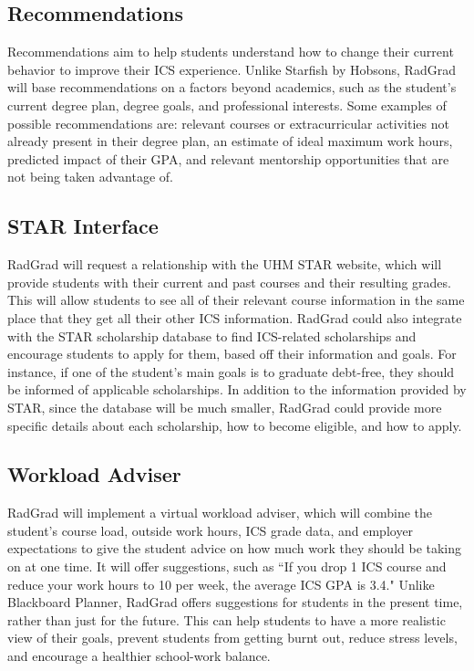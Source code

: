 \subsection{Recommendations}
Recommendations aim to help students understand how to change their current behavior to improve their ICS experience. Unlike Starfish by Hobsons, RadGrad will base recommendations on a factors beyond academics, such as the student's current degree plan, degree goals, and professional interests. Some examples of possible recommendations are: relevant courses or extracurricular activities not already present in their degree plan, an estimate of ideal maximum work hours, predicted impact of their GPA, and relevant mentorship opportunities that are not being taken advantage of. 
\subsection{STAR Interface}
RadGrad will request a relationship with the UHM STAR website, which will provide students with their current and past courses and their resulting grades. This will allow students to see all of their relevant course information in the same place that they get all their other ICS information. RadGrad could also integrate with the STAR scholarship database to find ICS-related scholarships and encourage students to apply for them, based off their information and goals. For instance, if one of the student's main goals is to graduate debt-free, they should be informed of applicable scholarships. In addition to the information provided by STAR, since the database will be much smaller, RadGrad could provide more specific details about each scholarship, how to become eligible, and how to apply. 
\subsection{Workload Adviser}
RadGrad will implement a virtual workload adviser, which will combine the student's course load, outside work hours, ICS grade data, and employer expectations to give the student advice on how much work they should be taking on at one time. It will offer suggestions, such as ``If you drop 1 ICS course and reduce your work hours to 10 per week, the average ICS GPA is 3.4." Unlike Blackboard Planner, RadGrad offers suggestions for students in the present time, rather than just for the future. This can help students to have a more realistic view of their goals, prevent students from getting burnt out, reduce stress levels, and encourage a healthier school-work balance.

